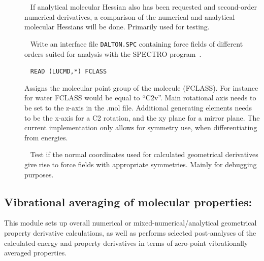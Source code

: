 \begin{description}
\item[]\verb| |\newline
If analytical molecular Hessian also has been requested and second-order
numerical derivatives, a comparison of the numerical and analytical
molecular Hessians will be done. Primarily used for testing.

\item[]\verb| |\newline
Write an interface file \verb|DALTON.SPC| containing force fields of
different orders suited for analysis with the SPECTRO
program~\cite{spectroref}.

\item[]\verb| |\newline
\verb|READ (LUCMD,*) FCLASS|

Assigns the molecular point group of the molecule (FCLASS). For
instance for water FCLASS would be equal to ``C2v''. Main rotational
axis needs to be set to the z-axis in the .mol file. Additional
generating elements needs to be the x-axis for a C2 rotation, and the
xy plane for a mirror plane. The current implementation only allows
for symmetry use, when differentiating from energies.

\item[]\verb| |\newline
Test if the normal coordinates used for calculated geometrical
derivatives give rise to force fields with appropriate
symmetries. Mainly for debugging purposes.

\end{description}

\subsection{Vibrational averaging of molecular properties: }
\label{sec:nmddrv.propan}

This module sets up overall numerical or mixed-numerical/analytical
geometrical property derivative calculations, as well as performs selected
post-analyses of the calculated energy and property derivatives in
terms of zero-point vibrationally averaged properties.

